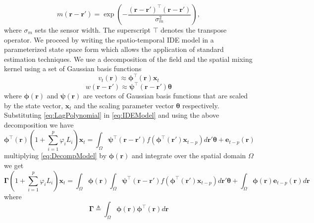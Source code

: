 \documentclass[a4paper,10pt]{article}
\begin{document}
\begin{equation}\label{eq:SensorKernel}
	m\left(\mathbf{r}-\mathbf{r}'\right) = \exp{\left(-\frac{(\mathbf{r}-\mathbf{r}')^\top(\mathbf{r}-\mathbf{r}')}{\sigma_m^2}\right)},
\end{equation}
where $\sigma_m$ sets the sensor width. The superscript $\top$ denotes the transpose operator. We proceed by writing the spatio-temporal IDE model in a parameterized state space form which allows the application of standard estimation techniques. We use a decomposition of the field and the spatial mixing kernel using a set of Gaussian basis functions
 \begin{equation}
	\label{eq:FieldDecomp} v_t\left(\mathbf{r}\right) \approx \boldsymbol{\phi}^{\top}\left(\mathbf{r}\right) \mathbf{x}_t
\end{equation}
\begin{equation}\label{eq:KernelDecomp}
	 w\left(\mathbf{r}-\mathbf{r}'\right) \approx\boldsymbol{\psi}^\top\left(\mathbf{r}-\mathbf{r}'\right) \boldsymbol{\theta}
\end{equation}
where $\mathbf{\boldsymbol{\phi}}(\mathbf{r})$ and $\mathbf{\boldsymbol{\psi}}(\mathbf{r})$ are  vectors of Gaussian basis functions that are scaled by the state vector, $\mathbf{x}_t$ and the scaling parameter vector $\boldsymbol\theta$ respectively. Substituting \eqref{eq:LagPolynomial} in \eqref{eq:IDEModel} and using the above decomposition we have
\begin{equation}\label{eq:DecompModel}
\boldsymbol{\phi}^{\top}\left(\mathbf{r}\right)(1+\sum_{i=1}^{p}\varphi_i L_i) \mathbf{x}_t=\int_{\Omega}\boldsymbol{\psi}^\top\left(\mathbf{r}-\mathbf{r}'\right) f(\boldsymbol{\phi}^{\top}\left(\mathbf{r'}\right) \mathbf{x}_{t-p})d\mathbf r'\boldsymbol{\theta}+\mathbf e_{t-p}(\mathbf r)
 \end{equation}
multiplying \eqref{eq:DecompModel} by $\boldsymbol \phi(\mathbf r)$ and integrate over the spatial domain $\Omega$ we get
\begin{equation}\label{eq:GammaDecompModel}
 \boldsymbol \Gamma (1+\sum_{i=1}^{p}\varphi_i L_i) \mathbf{x}_t=\int_{\Omega}\boldsymbol \phi(\mathbf r)\int_{\Omega}\boldsymbol{\psi}^\top\left(\mathbf{r}-\mathbf{r}'\right) f(\boldsymbol{\phi}^{\top}\left(\mathbf{r'}\right) \mathbf{x}_{t-p})d\mathbf r'\boldsymbol{\theta}+\int_{\Omega}\boldsymbol\phi(\mathbf r)\mathbf e_{t-p}(\mathbf r)d\mathbf r
\end{equation}
where 
\begin{equation}\label{eq:DefGamma}
	\boldsymbol{\Gamma} \triangleq \int_\Omega {\boldsymbol{\phi} \left(\mathbf{r}\right)\boldsymbol{\phi} ^{\top}\left(\mathbf{r}\right)d\mathbf{r}} 
\end{equation}
\end{document}
